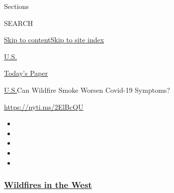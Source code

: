 Sections

SEARCH

\protect\hyperlink{site-content}{Skip to
content}\protect\hyperlink{site-index}{Skip to site index}

\href{https://www.nytimes3xbfgragh.onion/section/us}{U.S.}

\href{https://myaccount.nytimes3xbfgragh.onion/auth/login?response_type=cookie\&client_id=vi}{}

\href{https://www.nytimes3xbfgragh.onion/section/todayspaper}{Today's
Paper}

\href{/section/us}{U.S.}\textbar{}Can Wildfire Smoke Worsen Covid-19
Symptoms?

\url{https://nyti.ms/2ElBcQU}

\begin{itemize}
\item
\item
\item
\item
\item
\end{itemize}

\hypertarget{wildfires-in-the-west}{%
\subsubsection{\texorpdfstring{\href{https://www.nytimes3xbfgragh.onion/spotlight/california-wildfires?name=styln-california-wildfires\&region=TOP_BANNER\&block=storyline_menu_recirc\&action=click\&pgtype=Article\&impression_id=6e55b150-f52b-11ea-973c-a7164f8a6e9d\&variant=undefined}{Wildfires
in the West}}{Wildfires in the West}}\label{wildfires-in-the-west}}

